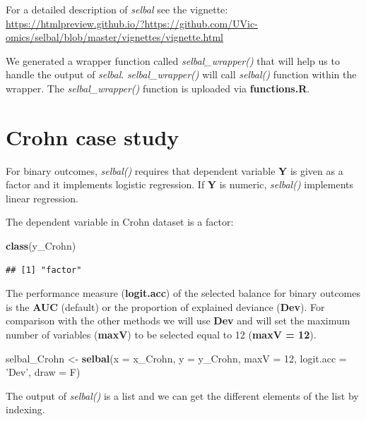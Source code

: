 \documentclass[openany]{book}
\newenvironment{Shaded}{\begin{snugshade}}{\end{snugshade}}
\newcommand{\KeywordTok}[1]{\textcolor[rgb]{0.13,0.29,0.53}{\textbf{#1}}}
\newcommand{\DataTypeTok}[1]{\textcolor[rgb]{0.13,0.29,0.53}{#1}}
\newcommand{\DecValTok}[1]{\textcolor[rgb]{0.00,0.00,0.81}{#1}}
\newcommand{\StringTok}[1]{\textcolor[rgb]{0.31,0.60,0.02}{#1}}
\newcommand{\NormalTok}[1]{#1}
\begin{document}
For a detailed description of \emph{selbal} see the vignette:
\url{https://htmlpreview.github.io/?https://github.com/UVic-omics/selbal/blob/master/vignettes/vignette.html}

We generated a wrapper function called \emph{selbal\_wrapper()} that
will help us to handle the output of \emph{selbal}.
\emph{selbal\_wrapper()} will call \emph{selbal()} function within the
wrapper. The \emph{selbal\_wrapper()} function is uploaded via
\textbf{functions.R}.

\section{Crohn case study}\label{crohn-case-study}

For binary outcomes, \emph{selbal()} requires that dependent variable
\textbf{Y} is given as a factor and it implements logistic regression.
If \textbf{Y} is numeric, \emph{selbal()} implements linear regression.

The dependent variable in Crohn dataset is a factor:

\begin{Shaded}
\begin{Highlighting}[]
\KeywordTok{class}\NormalTok{(y_Crohn)}
\end{Highlighting}
\end{Shaded}

\begin{verbatim}
## [1] "factor"
\end{verbatim}

The performance measure (\textbf{logit.acc}) of the selected balance for
binary outcomes is the \textbf{AUC} (default) or the proportion of
explained deviance (\textbf{Dev}). For comparison with the other methods
we will use \textbf{Dev} and will set the maximum number of variables
(\textbf{maxV}) to be selected equal to 12 (\textbf{maxV = 12}).

\begin{Shaded}
\begin{Highlighting}[]
\NormalTok{selbal_Crohn <-}\StringTok{ }\KeywordTok{selbal}\NormalTok{(}\DataTypeTok{x =}\NormalTok{ x_Crohn, }\DataTypeTok{y =}\NormalTok{ y_Crohn, }\DataTypeTok{maxV =} \DecValTok{12}\NormalTok{, }
                       \DataTypeTok{logit.acc =} \StringTok{'Dev'}\NormalTok{, }\DataTypeTok{draw =}\NormalTok{ F)}
\end{Highlighting}
\end{Shaded}

The output of \emph{selbal()} is a list and we can get the different
elements of the list by indexing.
\end{document}
